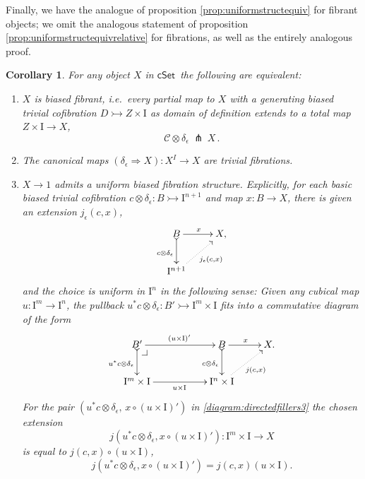 \documentclass[12pt]{article}
\makeatletter
\newcommand{\cSet}{\ensuremath{\mathsf{cSet}}}
\newcommand{\mono}{\ensuremath{\rightarrowtail}}
\newcommand{\ra}{\ensuremath{\rightarrow}}
\newcommand{\I}{\ensuremath{\mathrm{I}}}
\newtheorem{corollary}[theorem]{Corollary}
\theoremstyle{remark}
\theoremstyle{definition}
\newcommand{\pbcorner}[1][dr]{\save*!/#1-1.2pc/#1:(-1,1)@^{|-}\restore}
\makeatother
\begin{document}
Finally, we have the analogue of proposition \ref{prop:uniformstructequiv} for fibrant objects; we omit the analogous statement of proposition \ref{prop:uniformstructequivrelative} for fibrations, as well as the entirely analogous proof.

\begin{corollary}\label{cor:uniformfibstructequiv}  For any object $X$ in \cSet\ the following are equivalent:
\begin{enumerate}
\item $X$ is \emph{biased fibrant}, i.e.\ every partial map to $X$ with a generating biased trivial cofibration $D \mono Z \times \I$ as domain of definition extends to a total map $Z \times \I \ra X$,
$$\mathcal{C}\otimes \delta_\epsilon\ \pitchfork\ X\,.$$

\item The canonical maps $(\delta_\epsilon\Rightarrow{X}) : X^I \ra X$ are trivial fibrations.

\item $X\ra 1$ admits a \emph{uniform biased fibration structure}.  Explicitly, for each basic biased trivial cofibration $c \otimes \delta_\epsilon : B \mono \I^{n+1}$ and map $x : B\ra X$, there is given an extension $j_\epsilon(c,x)$,
\begin{equation}\label{diagram:directedfillers2}
\xymatrix{
B \ar@{>->}[d]_{c \otimes \delta_\epsilon} \ar[r]^{x} & X, \\
\I^{n+1}\ar@{.>}[ru]_{j_\epsilon(c,x)} &
}
\end{equation}
and the choice is \emph{uniform in $\I^n$} in the following sense: Given any cubical map $u : \I^m \ra \I^n$, the pullback  $u^*c \otimes \delta_\epsilon : B'\mono \I^{m}\times\I$ fits into a commutative diagram of the form
\begin{equation}\label{diagram:directedfillers3}
\xymatrix{
B' \ar@{>->}[d]_{u^*c \otimes \delta_\epsilon} \ar[rr]^{(u\times\I)'} \pbcorner &&  B \ar@{>->}[d]_{c \otimes \delta_\epsilon } \ar[r]^{x} & X. \\
\I^{m}\times\I \ar[rr]_{u\times\I } && \I^{n}\times\I \ar@{.>}[ru]_{j(c,x)} &
}
\end{equation}
For the pair $(u^*c \otimes \delta_\epsilon,\, x\circ (u\times\I)')$ in \eqref{diagram:directedfillers3} the chosen extension $$j(u^*c \otimes \delta_\epsilon,x\circ (u\times\I)'): \I^m\times\I \ra X$$ is equal to  $j(c,x)\circ (u\times\I)$,
\begin{equation}\label{eq:uniformfillers2}
j(u^*c \otimes \delta_\epsilon,x\circ(u\times\I)') = j(c,x) (u\times\I).
\end{equation}
\end{enumerate}
\end{corollary}
\end{document}

